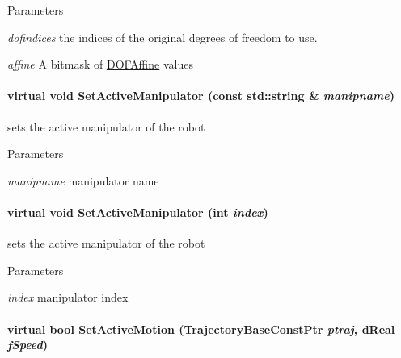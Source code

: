 \begin{DoxyParams}{Parameters}
\item[{\em dofindices}]the indices of the original degrees of freedom to use. \item[{\em affine}]A bitmask of \hyperlink{namespaceOpenRAVE_a3016e2185103f3c1bdc5e4482893ca98}{DOFAffine} values \end{DoxyParams}
\hypertarget{classOpenRAVE_1_1RobotBase_a479c1b360a34fdc516369e1c3dbb3dc5}{
\paragraph[{SetActiveManipulator}]{\setlength{\rightskip}{0pt plus 5cm}virtual void SetActiveManipulator (const std::string \& {\em manipname})}\hfill}
\label{classOpenRAVE_1_1RobotBase_a479c1b360a34fdc516369e1c3dbb3dc5}
sets the active manipulator of the robot 
\begin{DoxyParams}{Parameters}
\item[{\em manipname}]manipulator name \end{DoxyParams}
\hypertarget{classOpenRAVE_1_1RobotBase_aff994b4316d3a31304ee13227e72322b}{
\paragraph[{SetActiveManipulator}]{\setlength{\rightskip}{0pt plus 5cm}virtual void SetActiveManipulator (int {\em index})}\hfill}
\label{classOpenRAVE_1_1RobotBase_aff994b4316d3a31304ee13227e72322b}
sets the active manipulator of the robot 
\begin{DoxyParams}{Parameters}
\item[{\em index}]manipulator index \end{DoxyParams}
\hypertarget{classOpenRAVE_1_1RobotBase_afae0e0c1c67c2b5295255e684197bb0d}{
\paragraph[{SetActiveMotion}]{\setlength{\rightskip}{0pt plus 5cm}virtual bool SetActiveMotion (TrajectoryBaseConstPtr {\em ptraj}, \/  dReal {\em fSpeed})}\hfill}
